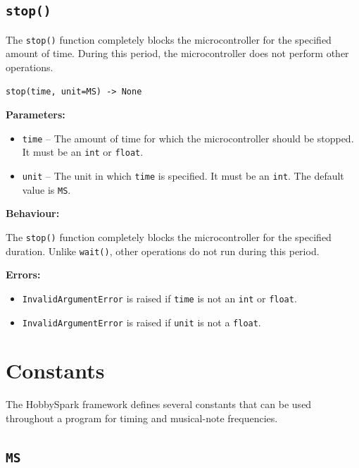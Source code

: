 \subsection{\texttt{stop()}}

The \texttt{stop()} function completely blocks the microcontroller for the
specified amount of time. During this period, the microcontroller does not
perform other operations.

\begin{lstlisting}
stop(time, unit=MS) -> None
\end{lstlisting}

\textbf{Parameters:}

\begin{itemize}
    \item \texttt{time} -- The amount of time for which the microcontroller
    should be stopped. It must be an \texttt{int} or \texttt{float}.
    
    \item \texttt{unit} -- The unit in which \texttt{time} is specified.
    It must be an \texttt{int}. The default value is \texttt{MS}.
\end{itemize}

\textbf{Behaviour:}

The \texttt{stop()} function completely blocks the microcontroller for the
specified duration. Unlike \texttt{wait()}, other operations do not run during
this period.

\textbf{Errors:}

\begin{itemize}
    \item \texttt{InvalidArgumentError} is raised if \texttt{time} is not an
    \texttt{int} or \texttt{float}.
    
    \item \texttt{InvalidArgumentError} is raised if \texttt{unit} is not a
    \texttt{float}.
\end{itemize}

\newpage
\section{Constants}

The HobbySpark framework defines several constants that can be used
throughout a program for timing and musical-note frequencies.

\subsection{\texttt{MS}}




